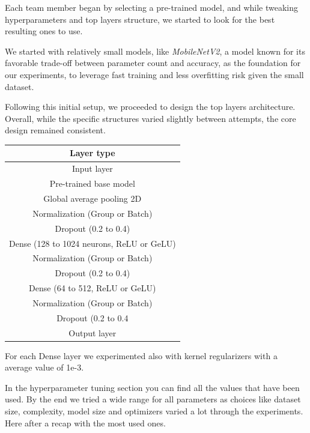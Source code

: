 \documentclass[11pt]{article}
\begin{document}
Each team member began by selecting a pre-trained model, and while tweaking hyperparameters and top layers structure, we started to look for the best resulting ones to use.

We started with relatively small models, like \textit{MobileNetV2}, a model known for its favorable trade-off between parameter count and accuracy, as the foundation for our experiments, to leverage fast training and less overfitting risk given the small dataset.

Following this initial setup, we proceeded to design the top layers architecture. 
Overall, while the specific structures varied slightly between attempts, the core design remained consistent.

\begin{table}[h!]
    \centering
    \begin{tabular}{|c|}
        \hline
        \textbf{Layer type} \\ \hline
        Input layer \\ \hline
        Pre-trained base model \\ \hline
        Global average pooling 2D \\ \hline
        Normalization (Group or Batch) \\ \hline
        Dropout (0.2 to 0.4) \\ \hline
        Dense (128 to 1024 neurons, ReLU or GeLU) \\ \hline
        Normalization (Group or Batch) \\ \hline
        Dropout (0.2 to 0.4) \\ \hline
        Dense (64 to 512, ReLU or GeLU) \\ \hline
        Normalization (Group or Batch) \\ \hline
        Dropout (0.2 to 0.4 \\ \hline
        Output layer \\ \hline
    \end{tabular}
\end{table}
For each Dense layer we experimented also with kernel regularizers with a average value of 1e-3.

In the hyperparameter tuning section you can find all the values that have been used. By the end we tried a wide range for all parameters as choices like dataset size, complexity, model size and optimizers varied a lot through the experiments.
Here after a recap with the most used ones.
\end{document}
